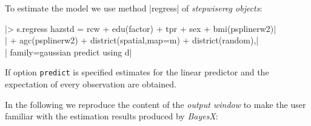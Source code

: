 To estimate the model we use method |regress| of {\it stepwisereg objects}:

 |> s.regress hazstd = rcw + edu(factor) + tpr + sex + bmi(psplinerw2)|\\
 |  + agc(psplinerw2) + district(spatial,map=m) + district(random),|\\
 |  family=gaussian predict using d|


If option {\tt predict} is specified estimates for the linear predictor and the expectation of every observation are obtained.

In the following we reproduce the content of the {\it output window} to make the user familiar with the estimation results
produced by {\it BayesX}:

\footnotesize
